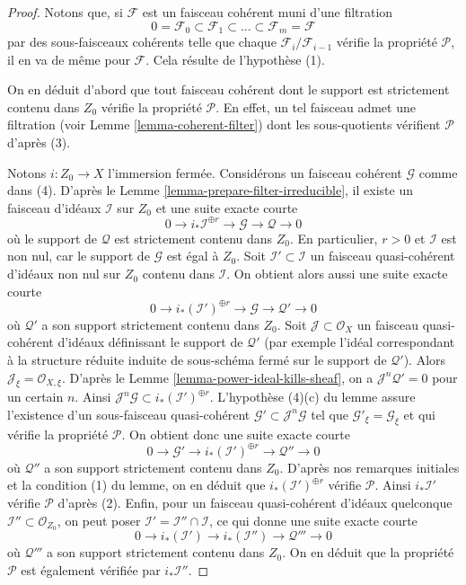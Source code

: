 \begin{proof}
Notons que, si $\mathcal{F}$ est un faisceau cohérent muni d'une filtration
$$
0 = \mathcal{F}_0 \subset \mathcal{F}_1 \subset
\ldots \subset \mathcal{F}_m = \mathcal{F}
$$
par des sous-faisceaux cohérents telle que chaque $\mathcal{F}_i/\mathcal{F}_{i - 1}$
vérifie la propriété $\mathcal{P}$, il en va de même pour $\mathcal{F}$.
Cela résulte de l'hypothèse (1).

\medskip\noindent
On en déduit d'abord que tout faisceau cohérent dont le support
est strictement contenu dans $Z_0$ vérifie la propriété $\mathcal{P}$. En effet, un tel
faisceau admet une filtration (voir Lemme \ref{lemma-coherent-filter})
dont les sous-quotients vérifient $\mathcal{P}$ d'après (3).

\medskip\noindent
Notons $i : Z_0 \to X$ l'immersion fermée.
Considérons un faisceau cohérent $\mathcal{G}$ comme dans (4).
D'après le Lemme \ref{lemma-prepare-filter-irreducible},
il existe un faisceau d'idéaux $\mathcal{I}$ sur $Z_0$ et
une suite exacte courte
$$
0 \to
i_*\mathcal{I}^{\oplus r} \to
\mathcal{G} \to
\mathcal{Q} \to 0
$$
où le support de $\mathcal{Q}$ est strictement contenu dans $Z_0$.
En particulier, $r > 0$ et $\mathcal{I}$ est non nul,
car le support de $\mathcal{G}$ est égal à $Z_0$.
Soit $\mathcal{I}' \subset \mathcal{I}$ un faisceau quasi-cohérent
d'idéaux non nul sur $Z_0$ contenu dans $\mathcal{I}$.
On obtient alors aussi une suite exacte courte
$$
0 \to
i_*(\mathcal{I}')^{\oplus r} \to
\mathcal{G} \to
\mathcal{Q}' \to 0
$$
où $\mathcal{Q}'$ a son support strictement contenu dans $Z_0$.
Soit $\mathcal{J} \subset \mathcal{O}_X$ un faisceau quasi-cohérent
d'idéaux définissant le support de $\mathcal{Q}'$ (par exemple
l'idéal correspondant à la structure réduite induite de sous-schéma fermé
sur le support de $\mathcal{Q}'$). Alors
$\mathcal{J}_\xi = \mathcal{O}_{X, \xi}$. D'après le
Lemme \ref{lemma-power-ideal-kills-sheaf},
on a $\mathcal{J}^n\mathcal{Q}' = 0$ pour un certain $n$.
Ainsi $\mathcal{J}^n\mathcal{G} \subset i_*(\mathcal{I}')^{\oplus r}$.
L'hypothèse (4)(c) du lemme assure l'existence
d'un sous-faisceau quasi-cohérent $\mathcal{G}' \subset \mathcal{J}^n\mathcal{G}$
tel que $\mathcal{G}'_\xi = \mathcal{G}_\xi$
et qui vérifie la propriété $\mathcal{P}$.
On obtient donc une suite exacte courte
$$
0 \to \mathcal{G}' \to
i_*(\mathcal{I}')^{\oplus r} \to
\mathcal{Q}'' \to 0
$$
où $\mathcal{Q}''$ a son support strictement contenu dans $Z_0$.
D'après nos remarques initiales et la condition (1) du lemme,
on en déduit que $i_*(\mathcal{I}')^{\oplus r}$ vérifie
$\mathcal{P}$. Ainsi $i_*\mathcal{I}'$ vérifie
$\mathcal{P}$ d'après (2). Enfin, pour un faisceau quasi-cohérent
d'idéaux quelconque $\mathcal{I}'' \subset \mathcal{O}_{Z_0}$, on peut poser
$\mathcal{I}' = \mathcal{I}'' \cap \mathcal{I}$, ce qui donne
une suite exacte courte
$$
0 \to
i_*(\mathcal{I}') \to
i_*(\mathcal{I}'') \to
\mathcal{Q}''' \to 0
$$
où $\mathcal{Q}'''$ a son support strictement contenu dans $Z_0$.
On en déduit que la propriété $\mathcal{P}$ est également vérifiée par
$i_*\mathcal{I}''$.


\end{proof}
